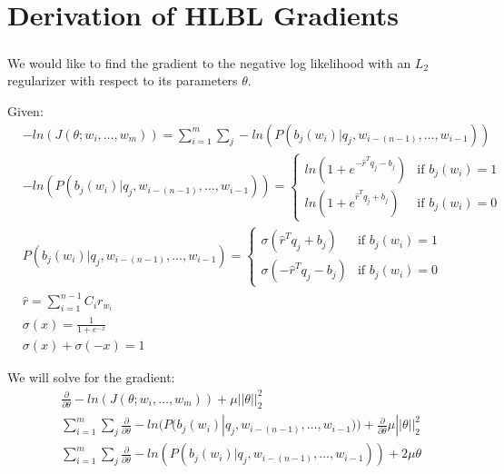 
\chapter{Derivation of HLBL Gradients}
\paragraph{}
We would like to find the gradient to the negative log likelihood with an $L_2$ regularizer with respect to its parameters $\theta$.

Given:
\begin{align*}
&-ln(J(\theta;w_i,\dots, w_m)) = \sum_{i=1}^{m} \sum_j -ln(P(b_j(w_i) | q_j, w_{i-(n-1)},\dots, w_{i-1}))
\\ 
&-ln(P(b_j(w_i) | q_j, w_{i-(n-1)},\dots, w_{i-1})) =  
\begin{cases}
  ln (1 + e^{-\hat{r}^T q_{j} -b_{j}}) & \text{if } b_j(w_i)  = 1 \\
  ln (1 + e^{\hat{r}^T q_{j} +b_{j}})     & \text{if } b_j(w_i) = 0
  \end{cases}
\\
&P(b_j(w_i) | q_j, w_{i-(n-1)},\dots, w_{i-1}) =  
\begin{cases}
  \sigma(\hat{r}^T q_{j} +b_{j}) & \text{if } b_j(w_i)  = 1 \\
  \sigma(-\hat{r}^T q_{j} -b_{j})     & \text{if } b_j(w_i) = 0
  \end{cases}
\\
&\hat{r} = \sum_{i=1}^{n-1} C_i r_{w_i} 
\\
&\sigma(x) = \frac{1}{1+e^{-x}}
\\
&\sigma(x) +\sigma(-x) = 1
\end{align*}

We will solve for the gradient:
\begin{align*}
&\frac{\partial}{\partial \theta} -ln(J(\theta;w_i,\dots, w_m)) +  \mu ||\theta||^2_2
\\
& \sum_{i=1}^{m} \sum_j \frac{\partial}{\partial \theta} -ln(P(b_j(w_i) | q_j, w_{i-(n-1)},\dots, w_{i-1})) +\frac{\partial}{\partial \theta}  \mu ||\theta||^2_2
\\
& \sum_{i=1}^{m} \sum_j \frac{\partial}{\partial \theta} -ln(P(b_j(w_i) | q_j, w_{i-(n-1)},\dots, w_{i-1})) + 2 \mu \theta
\end{align*}

